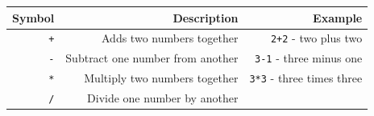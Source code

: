 \documentclass[]{book}
\begin{document}
\begin{longtable}[]{@{}rrr@{}}
\toprule
\begin{minipage}[b]{0.30\columnwidth}\raggedleft
Symbol\strut
\end{minipage} & \begin{minipage}[b]{0.30\columnwidth}\raggedleft
Description\strut
\end{minipage} & \begin{minipage}[b]{0.30\columnwidth}\raggedleft
Example\strut
\end{minipage}\tabularnewline
\midrule
\endhead
\begin{minipage}[t]{0.30\columnwidth}\raggedleft
\texttt{+}\strut
\end{minipage} & \begin{minipage}[t]{0.30\columnwidth}\raggedleft
Adds two numbers together\strut
\end{minipage} & \begin{minipage}[t]{0.30\columnwidth}\raggedleft
\texttt{2+2} - two plus two\strut
\end{minipage}\tabularnewline
\begin{minipage}[t]{0.30\columnwidth}\raggedleft
\texttt{-}\strut
\end{minipage} & \begin{minipage}[t]{0.30\columnwidth}\raggedleft
Subtract one number from another\strut
\end{minipage} & \begin{minipage}[t]{0.30\columnwidth}\raggedleft
\texttt{3-1} - three minus one\strut
\end{minipage}\tabularnewline
\begin{minipage}[t]{0.30\columnwidth}\raggedleft
\texttt{*}\strut
\end{minipage} & \begin{minipage}[t]{0.30\columnwidth}\raggedleft
Multiply two numbers together\strut
\end{minipage} & \begin{minipage}[t]{0.30\columnwidth}\raggedleft
\texttt{3*3} - three times three\strut
\end{minipage}\tabularnewline
\begin{minipage}[t]{0.30\columnwidth}\raggedleft
\texttt{/}\strut
\end{minipage} & \begin{minipage}[t]{0.30\columnwidth}\raggedleft
Divide one number by another\strut
\end{minipage} & \begin{minipage}[t]{0.30\columnwidth}\raggedleft

\end{minipage}
\end{longtable}
\end{document}
